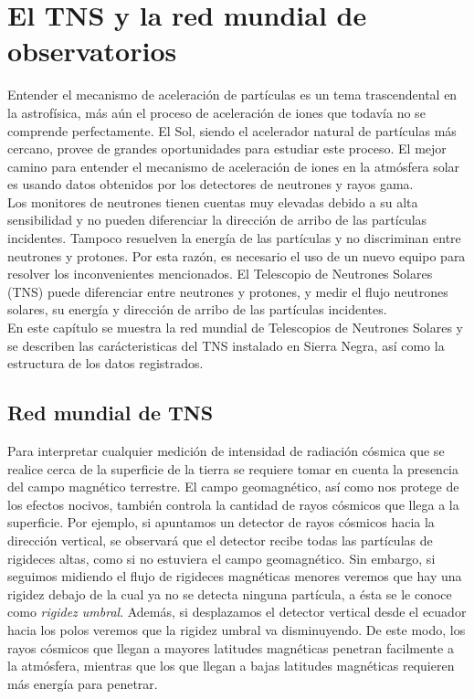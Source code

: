 \chapter{El TNS y la red mundial de observatorios}
Entender el mecanismo de aceleración de partículas es un tema trascendental en la astrofísica, más aún el proceso de aceleración de iones que todavía no se comprende perfectamente. El Sol, siendo el acelerador natural de partículas más cercano, provee de grandes oportunidades para estudiar este proceso\cite{ValdesGalicia2009565}. El mejor camino para entender el mecanismo de aceleración de iones en la atmósfera solar es usando datos obtenidos por los detectores de neutrones y rayos gama\cite{murak}.\\

Los monitores de neutrones tienen cuentas muy elevadas debido a su alta sensibilidad y no pueden diferenciar la dirección de arribo de las partículas incidentes\cite{Tsuchiya2001183}. Tampoco resuelven la energía de las partículas y no discriminan entre neutrones y protones. Por esta razón, es necesario el uso de un nuevo equipo para resolver los inconvenientes mencionados. El Telescopio de Neutrones Solares \textsc{(TNS)} puede diferenciar entre neutrones y protones, y medir el flujo neutrones solares, su energía y dirección de arribo de las partículas incidentes\cite{valdes,TNS}.\\

En este capítulo se muestra la red mundial de Telescopios de Neutrones Solares y se describen las carácteristicas del TNS instalado en Sierra Negra, así como la estructura de los datos registrados. \\

\section{Red mundial de TNS}

Para interpretar cualquier medición de intensidad de radiación cósmica que se realice cerca de la superficie de la tierra se requiere tomar en cuenta la presencia del campo magnético terrestre. El campo geomagnético, así como nos protege de los efectos nocivos, también controla la cantidad de rayos cósmicos que llega a la superficie. Por ejemplo, si apuntamos un detector de rayos cósmicos hacia la dirección vertical, se observará que el detector recibe todas las partículas de rigideces altas, como si no estuviera el campo geomagnético. Sin embargo, si seguimos midiendo el flujo de rigideces magnéticas menores veremos que hay una rigidez debajo de la cual ya no se detecta ninguna partícula, a ésta se le conoce como \emph{rigidez umbral}. Además, si desplazamos el detector vertical desde el ecuador hacia los polos veremos que la rigidez umbral va disminuyendo\cite{mensajeros}. De este modo, los rayos cósmicos que llegan a mayores latitudes magnéticas penetran facilmente a la atmósfera, mientras que los que llegan a bajas latitudes magnéticas requieren más energía para penetrar.\\

